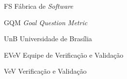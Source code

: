 \begin{siglas}
  \item[FS] Fábrica de \textit{Software}
  \item[GQM] \textit{Goal Question Metric}
  \item[UnB] Universidade de Brasília
  \item[EVeV] Equipe de Verificação e Validação
  \item[VeV] Verificação e Validação
\end{siglas}
